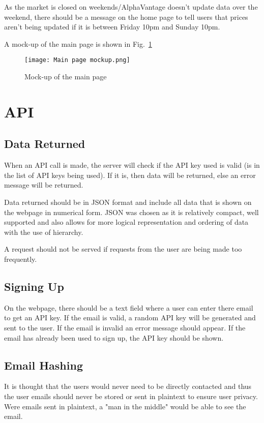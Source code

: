         As the market is closed on weekends/AlphaVantage doesn't update data over the weekend, there should be a message on the home page to tell users that prices aren't being updated if it is between Friday 10pm and Sunday 10pm.

        A mock-up of the main page is shown in Fig.~\ref{fig:main_page_mock} 

        \begin{figure}[h]
            \centering
            \texttt{[image: Main page mockup.png]}
            \caption{Mock-up of the main page}
            \label{fig:main_page_mock}
        \end{figure}


    \section{API}
        
        \subsection{Data Returned}
        When an API call is made, the server will check if the API key used is valid (is in the list of API keys being used). If it is, then data will be returned, else an error message will be returned.

        Data returned should be in JSON format and include all data that is shown on the webpage in numerical form. JSON was chosen as it is relatively compact, well supported and also allows for more logical representation and ordering of data with the use of hierarchy. 

        A request should not be served if requests from the user are being made too frequently.
    

        \subsection{Signing Up}
        On the webpage, there should be a text field where a user can enter there email to get an API key. If the email is valid, a random API key will be generated and sent to the user. If the email is invalid an error message should appear. If the email has already been used to sign up, the API key should be shown.

        \subsection{Email Hashing}
        It is thought that the users would never need to be directly contacted and thus the user emails should never be stored or sent in plaintext to ensure user privacy. Were emails sent in plaintext, a "man in the middle" would be able to see the email.

